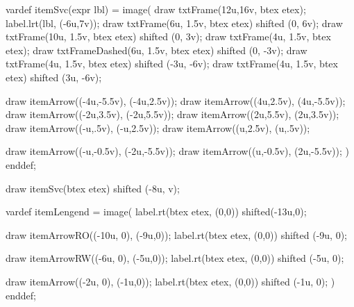 


vardef itemSvc(expr lbl) =
image(
	draw txtFrame(12u,16v, btex \mplabel{} etex);
	label.lrt(lbl, (-6u,7v));
	draw txtFrame(6u, 1.5v, btex  etex) shifted (0, 6v);
	draw txtFrame(10u, 1.5v, btex  etex) shifted (0, 3v);
	draw txtFrame(4u, 1.5v, btex  etex);
	draw txtFrameDashed(6u, 1.5v, btex  etex) shifted (0, -3v);
	draw txtFrame(4u, 1.5v, btex  etex) shifted (-3u, -6v);
	draw txtFrame(4u, 1.5v, btex  etex) shifted (3u, -6v);

	draw itemArrow((-4u,-5.5v), (-4u,2.5v));	%
	draw itemArrow((4u,2.5v), (4u,-5.5v));		%
	draw itemArrow((-2u,3.5v), (-2u,5.5v));		%
	draw itemArrow((2u,5.5v), (2u,3.5v));		%
	draw itemArrow((-u,.5v), (-u,2.5v));		%
	draw itemArrow((u,2.5v), (u,.5v));		%

	draw itemArrow((-u,-0.5v), (-2u,-5.5v));		%
	draw itemArrow((u,-0.5v), (2u,-5.5v));		%
)
enddef;


draw itemSvc(btex  etex) shifted (-8u, v);

vardef itemLengend =
image(
	label.rt(btex  etex, (0,0)) shifted(-13u,0);

	draw itemArrowRO((-10u, 0), (-9u,0));
	label.rt(btex  etex, (0,0)) shifted (-9u, 0);

	draw itemArrowRW((-6u, 0), (-5u,0));
	label.rt(btex  etex, (0,0)) shifted (-5u, 0);

	draw itemArrow((-2u, 0), (-1u,0));
	label.rt(btex  etex, (0,0)) shifted (-1u, 0);
)
enddef;


\stopreusableMPgraphic

